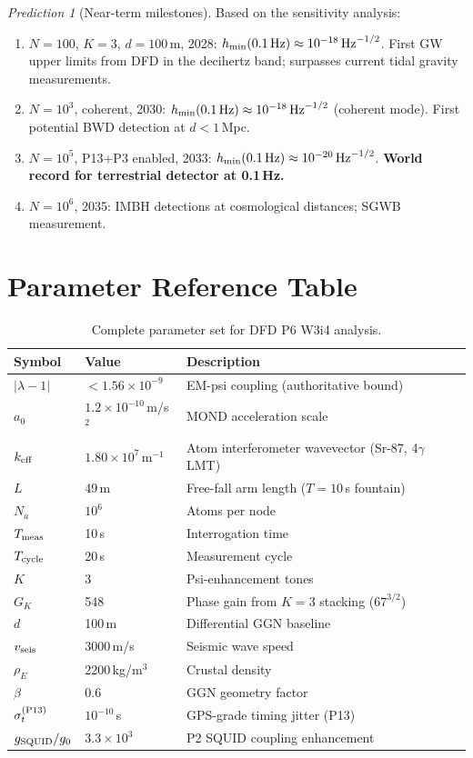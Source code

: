 \documentclass[11pt]{article}
\theoremstyle{definition}
\theoremstyle{remark}
\newtheorem{prediction}[theorem]{Prediction}
\newcommand{\sqrtHz}{\,\mathrm{Hz}^{-1/2}}
\newcommand{\ee}[1]{\times10^{#1}}
\begin{document}
\begin{prediction}[Near-term milestones]
\label{pred:milestones}
Based on the sensitivity analysis:
\begin{enumerate}
\item $N = 100$, $K=3$, $d=100$\,m, 2028: $h_{\min}(0.1\,\rm Hz) \approx 10^{-18}\sqrtHz$.
  First GW upper limits from DFD in the decihertz band; surpasses current
  tidal gravity measurements.
\item $N = 10^3$, coherent, 2030: $h_{\min}(0.1\,\rm Hz) \approx 10^{-18}\sqrtHz$
  (coherent mode).  First potential BWD detection at $d < 1$\,Mpc.
\item $N = 10^5$, P13+P3 enabled, 2033: $h_{\min}(0.1\,\rm Hz) \approx 10^{-20}\sqrtHz$.
  \textbf{World record for terrestrial detector at 0.1\,Hz.}
\item $N = 10^6$, 2035: IMBH detections at cosmological distances; SGWB measurement.
\end{enumerate}
\end{prediction}

\appendix
\section{Parameter Reference Table}

\begin{table}[h]
\centering
\caption{Complete parameter set for DFD P6 W3i4 analysis.}
\label{tab:params}
\begin{tabular}{@{}lll@{}}
\toprule
Symbol & Value & Description \\
\midrule
$|\lambda-1|$ & $< 1.56\ee{-9}$ & EM-psi coupling (authoritative bound) \\
$a_0$ & $1.2\ee{-10}$\,m/s$^2$ & MOND acceleration scale \\
$k_{\rm eff}$ & $1.80\ee{7}$\,m$^{-1}$ & Atom interferometer wavevector (Sr-87, 4$\gamma$ LMT) \\
$L$ & 49\,m & Free-fall arm length ($T=10$\,s fountain) \\
$N_a$ & $10^6$ & Atoms per node \\
$T_{\rm meas}$ & 10\,s & Interrogation time \\
$T_{\rm cycle}$ & 20\,s & Measurement cycle \\
$K$ & 3 & Psi-enhancement tones \\
$G_K$ & 548 & Phase gain from $K=3$ stacking ($67^{3/2}$) \\
$d$ & 100\,m & Differential GGN baseline \\
$v_{\rm seis}$ & 3000\,m/s & Seismic wave speed \\
$\rho_E$ & 2200\,kg/m$^3$ & Crustal density \\
$\beta$ & 0.6 & GGN geometry factor \\
$\sigma_t^{(\rm P13)}$ & $10^{-10}$\,s & GPS-grade timing jitter (P13) \\
$g_{\rm SQUID}/g_0$ & $3.3\ee{3}$ & P2 SQUID coupling enhancement \\
\bottomrule
\end{tabular}
\end{table}
\end{document}
